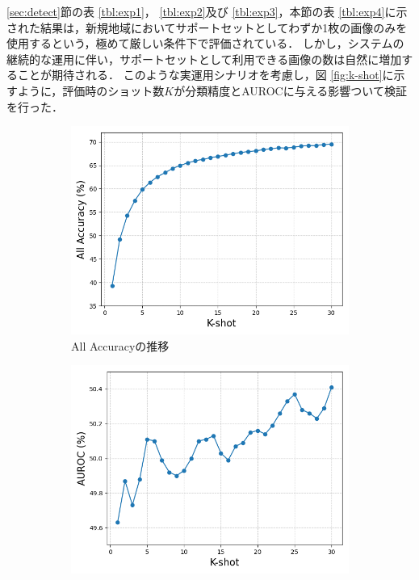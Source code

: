 \documentclass[a4paper,11pt,nomag]{jsreport}
\begin{document}
\ref{sec:detect}節の表 \ref{tbl:exp1}， \ref{tbl:exp2}及び \ref{tbl:exp3}，本節の表 \ref{tbl:exp4}に示された結果は，新規地域においてサポートセットとしてわずか1枚の画像のみを使用するという，極めて厳しい条件下で評価されている．
しかし，システムの継続的な運用に伴い，サポートセットとして利用できる画像の数は自然に増加することが期待される．
このような実運用シナリオを考慮し，図 \ref{fig:k-shot}に示すように，評価時のショット数$K$が分類精度とAUROCに与える影響ついて検証を行った．
% 
\begin{figure}[tbp]
  \centering
  \begin{subfigure}[b]{0.45\linewidth}
    \centering
    \includegraphics[height=0.9\linewidth, keepaspectratio]{image/sec2k-shotVSaccuracy.png}
    \caption{All Accuracyの推移}
    \label{fig:sec2Accuracy}
  \end{subfigure}
  \hfill
  \begin{subfigure}[b]{0.45\linewidth}
    \centering
    \includegraphics[height=0.9\linewidth, keepaspectratio]{image/sec2k-shotVSAUROC.png}

\end{subfigure}
\end{figure}
\end{document}
